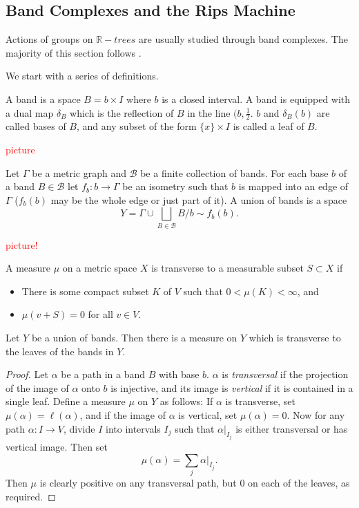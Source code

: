 \subsection{Band Complexes and the Rips Machine}
Actions of groups on $\mathbb{R}-trees$ are usually studied through band complexes. The majority of this section follows \cite{Wilton}.

We start with a series of definitions.
\begin{definition}
    A \textnormal{band} is a space $B=b\times I$ where $b$ is a closed interval. A band is equipped with a \textnormal{dual map} $\delta_B$ which is the reflection of $B$ in the line $(b,\frac{1}{2}$. $b$ and $\delta_B(b)$ are called \textnormal{bases} of $B$, and any subset of the form $\{x\}\times I$ is called a \textnormal{leaf} of $B$.
\end{definition}
\textcolor{red}{picture}

\begin{definition}
    Let $\Gamma$ be a metric graph and $\mathcal{B}$ be a finite collection of bands. For each base $b$ of a band $B\in \mathcal{B}$ let $f_b:b\rightarrow\Gamma$ be an isometry such that $b$ is mapped into an edge of $\Gamma$ ($f_b(b)$ may be the whole edge or just part of it). A \textnormal{union of bands} is a space \[Y=\Gamma\cup\underset{B\in\mathcal{B}}{\bigsqcup}B/b \sim f_b(b).\] 
\end{definition}
\textcolor{red}{picture!}

\begin{definition}
    A measure $\mu$ on a metric space $X$ is \textnormal{transverse} to a measurable subset $S\subset X$ if 
    \begin{itemize}
        \item There is some compact subset $K$ of $V$ such that $0<\mu(K)<\infty$, and
        \item $\mu(v+S)=0$ for all $v\in V$.
    \end{itemize}
\end{definition}

\begin{lemma}\label{Ymeasure}
    Let $Y$ be a union of bands. Then there is a measure on $Y$ which is transverse to the leaves of the bands in $Y$.
\end{lemma}
\begin{proof}
     Let $\alpha$ be a path in a band $B$ with base $b$. $\alpha$ is \textit{transversal} if the projection of the image of $\alpha$ onto $b$ is injective, and its image is \textit{vertical} if it is contained in a single leaf. Define a measure $\mu$ on $Y$ as follows: If $\alpha$ is transverse, set $\mu(\alpha)=\ell(\alpha)$, and if the image of $\alpha$ is vertical, set $\mu(\alpha)=0$. Now for any path $\alpha:I\rightarrow V$, divide $I$ into intervals $I_j$ such that $\alpha\vert_{I_j}$ is either transversal or has vertical image. Then set \[\mu(\alpha)=\underset{j}\sum\alpha\vert_{I_j}.\] Then $\mu$ is clearly positive on any transversal path, but 0 on each of the leaves, as required.
\end{proof}


